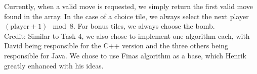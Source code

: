 Currently, when a valid move is requested, we simply return the first valid move found in the array. In the case of a choice tile, we always select the next player \((\text{player} + 1) \mod 8\). For bonus tiles, we always choose the bomb.\\
Credit: Similar to Task 4, we also chose to implement one algorithm each, with David being responsible for the C++ version and the three others 
being responsible for Java. We chose to use Finas algorithm as a base, which Henrik greatly enhanced with his ideas.
